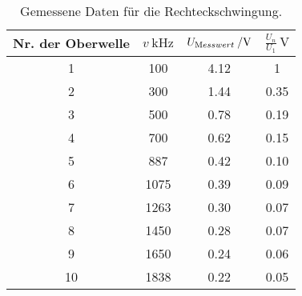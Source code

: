 \begin{table}[H]
  \centering
   \begin{tabular}{c c c c}
    \toprule
    Nr. der Oberwelle & $ v \: \si{\kHz}$ & $ U_{\text Messwert}\: / \si{\volt} $
    & $\frac{U_{n}}{U_{1}} \: \si{\volt} $  \\
    \midrule
    1 & 100 & 4.12 & 1 \\
    2 & 300 & 1.44 & 0.35 \\
    3 & 500 & 0.78 & 0.19 \\
    4 & 700 & 0.62 & 0.15 \\
    5 & 887 & 0.42 & 0.10 \\
    6 & 1075 & 0.39 & 0.09 \\
    7 & 1263 & 0.30 & 0.07 \\
    8 & 1450 & 0.28 & 0.07 \\
    9 & 1650 & 0.24 & 0.06 \\
    10 & 1838 & 0.22 & 0.05 \\
    \bottomrule
  \end{tabular}
  \caption{Gemessene Daten für die Rechteckschwingung.}
  \label{tab:tabe1}
\end{table}
